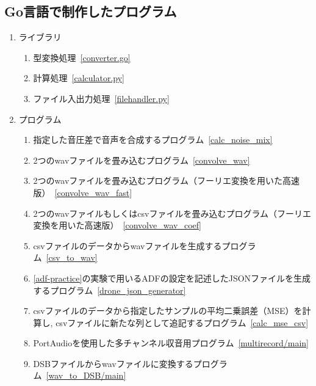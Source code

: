 \subsection{Go言語で制作したプログラム}\label{go}

\begin{enumerate}
\renewcommand{\labelenumi}{(\arabic{enumi})}
\tightlist

\item
  ライブラリ \\
  \begin{enumerate}
  \renewcommand{\labelenumi}{(\arabic{enumi})}
  \tightlist
  \item
    型変換処理\ \ref{converter.go}

  \item
    計算処理\  \ref{calculator.py}

  \item
    ファイル入出力処理\ \ref{filehandler.py}
  \end{enumerate}

\item
  プログラム

  \begin{enumerate}
  \renewcommand{\labelenumi}{(\arabic{enumi})}

  \item
    指定した音圧差で音声を合成するプログラム\ \ref{calc_noise_mix}

  \item
    2つのwavファイルを畳み込むプログラム\ \ref{convolve_wav}

  \item
    2つのwavファイルを畳み込むプログラム（フーリエ変換を用いた高速版）\ \ref{convolve_wav_fast}

  \item
    2つのwavファイルもしくはcsvファイルを畳み込むプログラム（フーリエ変換を用いた高速版）\ \ref{convolve_wav_coef}

  \item
    csvファイルのデータからwavファイルを生成するプログラム\ \ref{csv_to_wav}

  \item
    \ref{adf-practice}の実験で用いるADFの設定を記述したJSONファイルを生成するプログラム\ \ref{drone_json_generator}

  \item
    csvファイルのデータから指定したサンプルの平均二乗誤差（MSE）を計算し, csvファイルに新たな列として追記するプログラム\ \ref{calc_mse_csv}

  \item
    PortAudioを使用した多チャンネル収音用プログラム\ \ref{multirecord/main}

  \item
    DSBファイルからwavファイルに変換するプログラム\ \ref{wav_to_DSB/main}
  \end{enumerate}
\end{enumerate}


